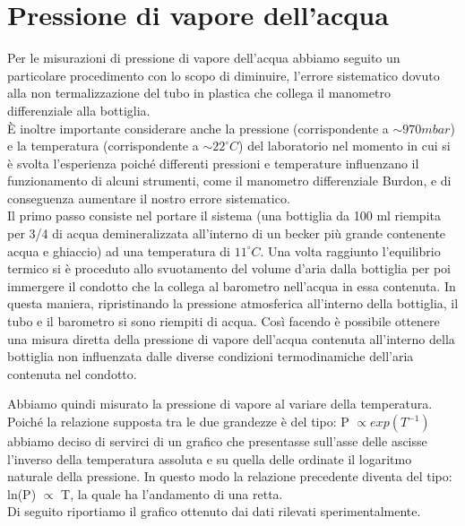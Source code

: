\documentclass[11pt]{article}
\begin{document}
\section{Pressione di vapore dell'acqua}
Per le misurazioni di pressione di vapore dell'acqua abbiamo seguito un particolare procedimento con lo scopo di diminuire, l'errore sistematico dovuto alla non termalizzazione del tubo in plastica che collega il manometro differenziale alla bottiglia.\\
È inoltre importante considerare anche la pressione  (corrispondente a $\sim 970 mbar$) e la temperatura (corrispondente a $\sim 22^\circ C$) del laboratorio nel momento in cui si è svolta l'esperienza poiché differenti pressioni e temperature influenzano il funzionamento di alcuni strumenti, come il manometro differenziale Burdon, e di conseguenza aumentare il nostro errore sistematico.\\
Il primo passo consiste nel portare il sistema (una bottiglia da 100 ml riempita per 3/4 di acqua demineralizzata all'interno di un becker più grande contenente acqua e ghiaccio) ad una temperatura di $11^\circ C$. Una volta raggiunto l'equilibrio termico si è proceduto allo svuotamento del volume d'aria dalla bottiglia per poi immergere il condotto che la collega al barometro nell'acqua in essa contenuta. In questa maniera, ripristinando la pressione atmosferica  all'interno della bottiglia, il tubo e il barometro si sono riempiti di acqua. Così facendo è possibile ottenere una misura diretta della pressione di vapore dell'acqua contenuta all'interno della bottiglia non influenzata dalle diverse condizioni termodinamiche dell'aria contenuta nel condotto.
 

Abbiamo quindi misurato la pressione di vapore al variare della temperatura. Poiché la relazione supposta tra le due grandezze è del tipo: P $\propto exp(T^{-1})$ abbiamo deciso di servirci di un grafico che presentasse sull'asse delle ascisse l'inverso della temperatura assoluta e su quella delle ordinate il logaritmo naturale della pressione. In questo modo la relazione precedente diventa del tipo: ln(P) $\propto$ T, la quale ha l'andamento di una retta.\\
Di seguito riportiamo il grafico ottenuto dai dati rilevati sperimentalmente.
\end{document}
